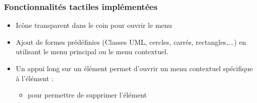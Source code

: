 \newpage
\subsubsection{Fonctionnalités tactiles implémentées}
\begin{itemize}
\item Icône transparent dans le coin pour ouvrir le menu
\item Ajout de formes prédéfinies (Classes UML, cercles, carrés, rectangles,...) en utilisant le menu principal ou le menu contextuel.
\item Un appui long sur un élément permet d'ouvrir un menu contextuel spécifique à l'élément :
\begin{itemize}
	\item pour permettre de supprimer l'élément
\end{itemize}


\end{itemize}
